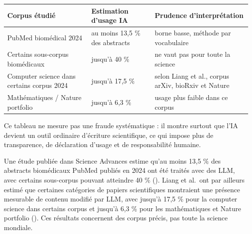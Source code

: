 \documentclass[
  10pt,
  a4paper,
  DIV=11,
  numbers=noendperiod,
  oneside]{scrreprt}
\newcounter{none} %
\begin{document}
{\def\LTcaptype{none} %
\begin{longtable}[]{@{}
  >{\raggedright\arraybackslash}p{}
  >{\raggedleft\arraybackslash}p{}
  >{\raggedright\arraybackslash}p{}@{}}
\toprule\noalign{}
\begin{minipage}[b]{\linewidth}\raggedright
Corpus étudié
\end{minipage} & \begin{minipage}[b]{\linewidth}\raggedleft
Estimation d'usage IA
\end{minipage} & \begin{minipage}[b]{\linewidth}\raggedright
Prudence d'interprétation
\end{minipage} \\
\midrule\noalign{}
\endhead
\bottomrule\noalign{}
\endlastfoot
PubMed biomédical 2024 & au moins 13,5 \% des abstracts & borne basse,
méthode par vocabulaire \\
Certains sous-corpus biomédicaux & jusqu'à 40 \% & ne vaut pas pour
toute la science \\
Computer science dans certains corpus 2024 & jusqu'à 17,5 \% & selon
Liang et al., corpus arXiv, bioRxiv et Nature \\
Mathématiques / Nature portfolio & jusqu'à 6,3 \% & usage plus faible
dans ce corpus \\
\end{longtable}
}

Ce tableau ne mesure pas une fraude systématique : il montre surtout que
l'IA devient un outil ordinaire d'écriture scientifique, ce qui impose
plus de transparence, de déclaration d'usage et de responsabilité
humaine.

Une étude publiée dans Science Advances estime qu'au moins 13,5 \% des
abstracts biomédicaux PubMed publiés en 2024 ont été traités avec des
LLM, avec certains sous-corpus pouvant atteindre 40 \%
(). Liang
et al.~ont par ailleurs estimé que certaines catégories de papiers
scientifiques montraient une présence mesurable de contenu modifié par
LLM, avec jusqu'à 17,5 \% pour la computer science dans certains corpus
et jusqu'à 6,3 \% pour les mathématiques et Nature portfolio
(). Ces résultats concernent des corpus précis, pas toute la
science mondiale.
\end{document}
